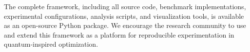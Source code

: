 The complete framework, including all source code, benchmark implementations, experimental configurations, analysis scripts, and visualization tools, is available as an open-source Python package. We encourage the research community to use and extend this framework as a platform for reproducible experimentation in quantum-inspired optimization.
